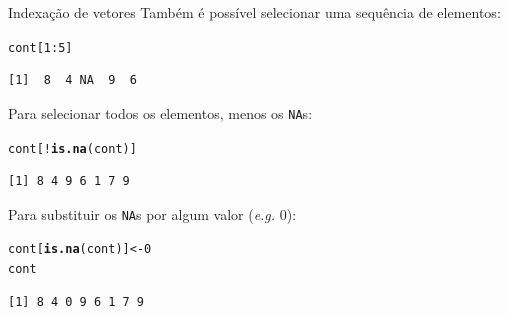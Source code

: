 \documentclass[10pt,handout]{beamer}\usepackage[]{graphicx}\usepackage[]{color}
\makeatletter
\newcommand{\hlnum}[1]{\textcolor[rgb]{0.686,0.059,0.569}{#1}}%
\newcommand{\hlopt}[1]{\textcolor[rgb]{0,0,0}{#1}}%
\newcommand{\hlstd}[1]{\textcolor[rgb]{0.345,0.345,0.345}{#1}}%
\newcommand{\hlkwb}[1]{\textcolor[rgb]{0.69,0.353,0.396}{#1}}%
\newcommand{\hlkwd}[1]{\textcolor[rgb]{0.282,0.239,0.545}{\textbf{#1}}}%
\newenvironment{kframe}{%
 \def\at@end@of@kframe{}%
 \ifinner\ifhmode%
  \def\at@end@of@kframe{\end{minipage}}%
  \begin{minipage}{\columnwidth}%
 \fi\fi%
 \def\FrameCommand##1{\hskip\@totalleftmargin \hskip-\fboxsep
 \colorbox{shadecolor}{##1}\hskip-\fboxsep
     \hskip-\linewidth \hskip-\@totalleftmargin \hskip\columnwidth}%
 \MakeFramed {\advance\hsize-\width
   \@totalleftmargin\z@ \linewidth\hsize
   \@setminipage}}%
 {\par\unskip\endMakeFramed%
 \at@end@of@kframe}
\newenvironment{knitrout}{}{} %
\makeatother
\begin{document}
\begin{frame}[fragile]{Indexação de vetores}
Também é possível selecionar uma sequência de elementos:
\begin{knitrout}\small
{}\color{fgcolor}\begin{kframe}
\begin{alltt}
\hlstd{cont[}\hlnum{1}\hlopt{:}\hlnum{5}\hlstd{]}
\end{alltt}
\begin{verbatim}
[1]  8  4 NA  9  6
\end{verbatim}
\end{kframe}
\end{knitrout}

Para selecionar todos os elementos, menos os \texttt{NA}s:
\begin{knitrout}\small
{}\color{fgcolor}\begin{kframe}
\begin{alltt}
\hlstd{cont[}\hlopt{!}\hlkwd{is.na}\hlstd{(cont)]}
\end{alltt}
\begin{verbatim}
[1] 8 4 9 6 1 7 9
\end{verbatim}
\end{kframe}
\end{knitrout}

Para substituir os \texttt{NA}s por algum valor (\textit{e.g.} 0):
\begin{knitrout}\small
{}\color{fgcolor}\begin{kframe}
\begin{alltt}
\hlstd{cont[}\hlkwd{is.na}\hlstd{(cont)]} \hlkwb{<-} \hlnum{0}
\hlstd{cont}
\end{alltt}
\begin{verbatim}
[1] 8 4 0 9 6 1 7 9
\end{verbatim}
\end{kframe}
\end{knitrout}

\end{frame}
\end{document}
